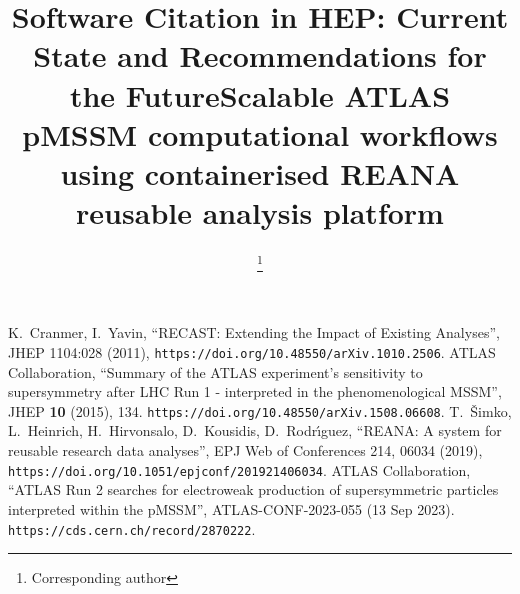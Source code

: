 \documentclass{latex/webofc}
\begin{document}
%
\title{Software Citation in HEP: Current State and Recommendations for the Future}

\title{Scalable ATLAS pMSSM computational workflows using containerised REANA reusable analysis platform}

\author{   \and
           \and
           \and
           \and
           \and
           \and
           \fnsep\thanks{Corresponding author } \and
           \and
          }


\abstract{%
 
}
%
\maketitle
%


%

%

%

%


\begin{thebibliography}{00}
 K.~Cranmer, I.~Yavin, ``RECAST: Extending the Impact of Existing Analyses'', JHEP 1104:028 (2011), \texttt{https://doi.org/10.48550/arXiv.1010.2506}.
 ATLAS Collaboration, ``Summary of the ATLAS experiment's sensitivity to supersymmetry after LHC Run 1 - interpreted in the phenomenological MSSM'', JHEP \textbf{10} (2015), 134. \texttt{https://doi.org/10.48550/arXiv.1508.06608}.
 T.~\v{S}imko,  L.~Heinrich,  H.~Hirvonsalo,  D.~Kousidis,  D.~Rodr\'{\i}guez, ``REANA: A system for reusable research data analyses'', EPJ Web of Conferences 214, 06034 (2019), \texttt{https://doi.org/10.1051/epjconf/201921406034}.
 ATLAS Collaboration, ``ATLAS Run 2 searches for electroweak production of supersymmetric particles interpreted within the pMSSM'', ATLAS-CONF-2023-055 (13 Sep 2023). \texttt{https://cds.cern.ch/record/2870222}.
\end{thebibliography}

% 
\end{document}
